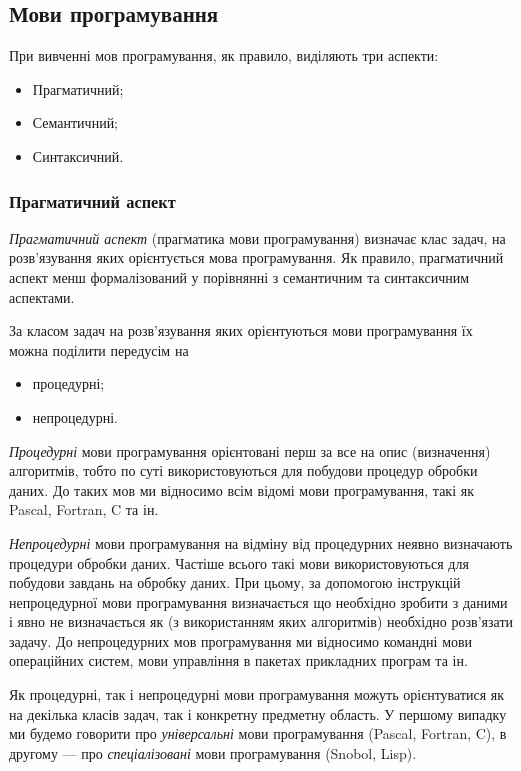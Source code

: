 ﻿\subsection{Мови програмування}

При вивченні мов програмування, як правило, виділяють три аспекти:
\begin{itemize}
	\item Прагматичний;
	\item Семантичний;
	\item Синтаксичний.
\end{itemize}

\subsubsection{Прагматичний аспект}

\textit{Прагматичний аспект} (прагматика мови програмування) визначає клас задач, на
розв'язування яких орієнтується мова програмування. Як правило, прагматичний аспект
менш формалізований у порівнянні з семантичним та синтаксичним аспектами. \medskip

За класом задач на розв'язування яких орієнтуються мови програмування 
їх можна поділити передусім на 
\begin{itemize}
	\item процедурні;
	\item непроцедурні.
\end{itemize}

\textit{Процедурні} мови програмування орієнтовані перш за все на опис
(визначення) алгоритмів, тобто по суті використовуються для побудови процедур
обробки даних. До таких мов ми відносимо всім відомі мови програмування, такі
як Pascal, Fortran, C та ін. \medskip

\textit{Непроцедурні} мови програмування на відміну від процедурних неявно
визначають процедури обробки даних. Частіше всього такі мови
використовуються для побудови завдань на обробку даних. При цьому, за
допомогою інструкцій непроцедурної мови програмування визначається що
необхідно зробити з даними і явно не визначається як (з використанням яких
алгоритмів) необхідно розв'язати задачу. До непроцедурних мов програмування
ми відносимо командні мови операційних систем, мови управління в пакетах
прикладних програм та ін. \medskip

Як процедурні, так і непроцедурні мови програмування можуть
орієнтуватися як на декілька класів задач, так і конкретну предметну область. У
першому випадку ми будемо говорити про \textit{універсальні} мови програмування
(Pascal, Fortran, C), в другому --- про \textit{спеціалізовані} мови програмування (Snobol, Lisp).

